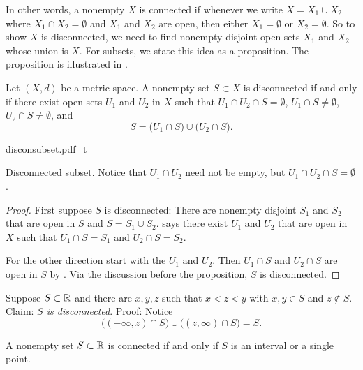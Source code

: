 In other words, a nonempty $X$ is connected if whenever we write
$X = X_1 \cup X_2$ where $X_1 \cap X_2 = \emptyset$ and $X_1$ and $X_2$ are
open, then either $X_1 = \emptyset$ or $X_2 = \emptyset$.
So to show $X$ is disconnected, we need to find nonempty
disjoint open sets $X_1$ and
$X_2$ whose union is $X$.
For subsets, we state this idea as a proposition.
The proposition is illustrated in .

\begin{prop}
Let $(X,d)$ be a metric space.
A nonempty set $S \subset X$ is disconnected if and only if
there exist open sets $U_1$ and
$U_2$ in $X$ such that $U_1 \cap U_2 \cap S = \emptyset$,
$U_1 \cap S \not= \emptyset$,
$U_2 \cap S \not= \emptyset$, and
\begin{equation*}
S = 
\bigl( U_1 \cap S \bigr)
\cup
\bigl( U_2 \cap S \bigr) .
\end{equation*}
\end{prop}

\begin{myfigureht}
{disconsubset.pdf_t}
\caption{Disconnected subset.  Notice that $U_1 \cap U_2$ need
not be empty, but $U_1 \cap U_2 \cap S = \emptyset$.\label{fig:disconsubset}}
\end{myfigureht}


\begin{proof}
First suppose $S$ is disconnected: There are
nonempty disjoint $S_1$ and $S_2$ that are
open in $S$ and $S = S_1 \cup S_2$.
 says there exist $U_1$ and $U_2$
that are open in $X$ such that $U_1 \cap S = S_1$ and
$U_2 \cap S = S_2$.

For the other direction start with the $U_1$ and $U_2$.
Then $U_1 \cap S$ and $U_2 \cap S$ are open in $S$ by
.
Via the discussion before the proposition, $S$ is disconnected.
\end{proof}

\begin{example}
Suppose $S \subset {\mathbb{R}}$ and there are $x,y,z$ such that $x < z < y$ with $x,y \in S$
and $z \notin S$.  Claim: \emph{$S$ is disconnected}.  Proof:  Notice
\begin{equation*}
\bigl( (-\infty,z) \cap S \bigr)
\cup
\bigl( (z,\infty) \cap S \bigr)
= S .
\end{equation*}
\end{example}

\begin{prop}
A nonempty set $S \subset {\mathbb{R}}$ is connected if and only if $S$ is
an interval or a single point.
\end{prop}

